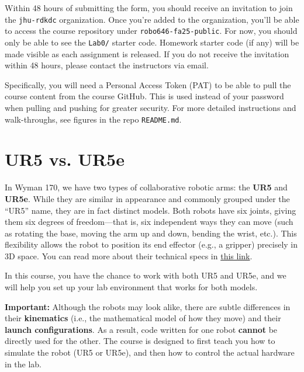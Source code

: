 \documentclass[hidelinks]{article}
\begin{document}
Within 48 hours of submitting the form, you should receive an invitation to join the \texttt{jhu-rdkdc} organization.
Once you're added to the organization, you'll be able to access the course repository under \verb+robo646-fa25-public+. For now, you should only be able to see the \verb+Lab0/+ starter code. Homework starter code (if any) will be made visible as each assignment is released. If you do not receive the invitation within 48 hours, please contact the instructors via email.

\vspace{0.1in}
Specifically, you will need a Personal Access Token (PAT) to be able to pull the course content from the course GitHub. This is used instead of your password when pulling and pushing for greater security. For more detailed instructions and walk-throughs, see figures in the repo \verb+README.md+.

\section*{UR5 vs. UR5e}

In Wyman 170, we have two types of collaborative robotic arms: the \textbf{UR5} and \textbf{UR5e}. While they are similar in appearance and commonly grouped under the “UR5” name, they are in fact distinct models. Both robots have six joints, giving them six degrees of freedom—that is, six independent ways they can move (such as rotating the base, moving the arm up and down, bending the wrist, etc.). This flexibility allows the robot to position its end effector (e.g., a gripper) precisely in 3D space. You can read more about their technical specs in \href{https://www.rarukautomation.com/collaborative-robots/ur-6-axis-collaborative-robots/ur5-robot/}{\color{blue}this link}.

\vspace{0.1in}
In this course, you have the chance to work with both UR5 and UR5e, and we will help you set up your lab environment that works for both models.

\vspace{0.1in}
\textbf{Important: }Although the robots may look alike, there are subtle differences in their \textbf{kinematics} (i.e., the mathematical model of how they move) and their \textbf{launch configurations}. As a result, code written for one robot \textbf{cannot} be directly used for the other. The course is designed to first teach you how to simulate the robot (UR5 or UR5e), and then how to control the actual hardware in the lab.
\end{document}
